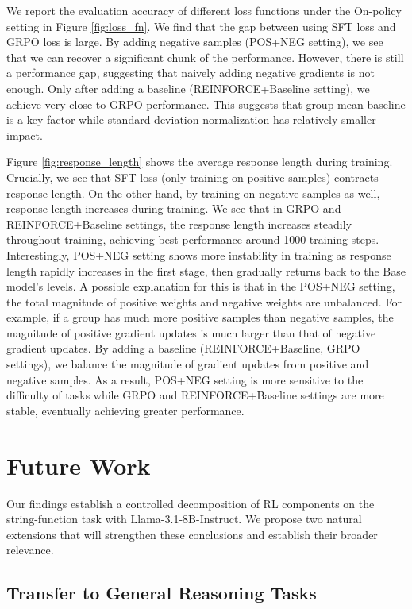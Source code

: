 \documentclass[12pt]{cmuthesis}
\begin{document}
We report the evaluation accuracy of different loss functions under the On-policy setting in Figure \ref{fig:loss_fn}. We find that the gap between using SFT loss and GRPO loss is large. By adding negative samples (POS+NEG setting), we see that we can recover a significant chunk of the performance. However, there is still a performance gap, suggesting that naively adding negative gradients is not enough. Only after adding a baseline (REINFORCE+Baseline setting), we achieve very close to GRPO performance. This suggests that group-mean baseline is a key factor while standard-deviation normalization has relatively smaller impact.

Figure \ref{fig:response_length} shows the average response length during training. Crucially, we see that SFT loss (only training on positive samples) contracts response length. On the other hand, by training on negative samples as well, response length increases during training. We see that in GRPO and REINFORCE+Baseline settings, the response length increases steadily throughout training, achieving best performance around 1000 training steps. Interestingly, POS+NEG setting shows more instability in training as response length rapidly increases in the first stage, then gradually returns back to the Base model's levels. A possible explanation for this is that in the POS+NEG setting, the total magnitude of positive weights and negative weights are unbalanced. For example, if a group has much more positive samples than negative samples, the magnitude of positive gradient updates is much larger than that of negative gradient updates. By adding a baseline (REINFORCE+Baseline, GRPO settings), we balance the magnitude of gradient updates from positive and negative samples. As a result, POS+NEG setting is more sensitive to the difficulty of tasks while GRPO and REINFORCE+Baseline settings are more stable, eventually achieving greater performance.
    


\chapter{Future Work}

Our findings establish a controlled decomposition of RL components on the string-function task with Llama-3.1-8B-Instruct. We propose two natural extensions that will strengthen these conclusions and establish their broader relevance.

\section{Transfer to General Reasoning Tasks}
\end{document}
